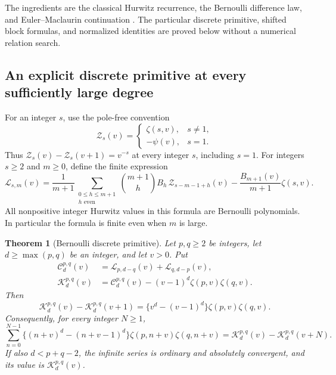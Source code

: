 \documentclass[11pt]{article}
\newtheorem{theorem}{Theorem}[section]
\theoremstyle{definition}
\theoremstyle{remark}
\numberwithin{equation}{section}
\begin{document}
The ingredients are the classical Hurwitz recurrence, the Bernoulli
difference law, and Euler--Maclaurin continuation
\cite{DLMF,DLMFBernoulli}.  The particular discrete
primitive, shifted block formulas, and normalized identities are proved
below without a numerical relation search.

\subsection{An explicit discrete primitive at every sufficiently large degree}

For an integer $s$, use the pole-free convention
\[
 \mathcal Z_s(v)=
 \begin{cases}
  \zeta(s,v),&s\ne1,\\
  -\psi(v),&s=1.
 \end{cases}
\]
Thus $\mathcal Z_s(v)-\mathcal Z_s(v+1)=v^{-s}$ at every
integer $s$, including $s=1$.  For integers $s\ge2$ and $m\ge0$,
define the finite expression
\begin{equation}\label{sh:L}
 \mathcal L_{s,m}(v)=\frac1{m+1}
    \sum_{\substack{0\le h\le m+1\\h\text{ even}}}
       \binom{m+1}{h}B_h\,
       \mathcal Z_{s-m-1+h}(v)
       -\frac{B_{m+1}(v)}{m+1}\zeta(s,v).
\end{equation}
All nonpositive integer Hurwitz values in this formula are Bernoulli
polynomials.  In particular the formula is finite even when $m$ is large.

\begin{theorem}[Bernoulli discrete primitive]\label{sh:primitive}
Let $p,q\ge2$ be integers, let $d\ge\max(p,q)$ be an integer,
and let $v>0$.  Put
\begin{align}
 \mathcal C_d^{p,q}(v)
   &=\mathcal L_{p,d-q}(v)+\mathcal L_{q,d-p}(v),\label{sh:Chigh}\\
 \mathcal K_d^{p,q}(v)
   &=\mathcal C_d^{p,q}(v)
       -(v-1)^d\zeta(p,v)\zeta(q,v).\label{sh:K}
\end{align}
Then
\begin{equation}\label{sh:antidifference}
 \boxed{\mathcal K_d^{p,q}(v)-\mathcal K_d^{p,q}(v+1)
  =\{v^d-(v-1)^d\}\zeta(p,v)\zeta(q,v).}
\end{equation}
Consequently, for every integer $N\ge1$,
\begin{equation}\label{sh:finitetelescoping}
 \sum_{n=0}^{N-1}
 \{(n+v)^d-(n+v-1)^d\}\zeta(p,n+v)\zeta(q,n+v)
 =\mathcal K_d^{p,q}(v)-\mathcal K_d^{p,q}(v+N).
\end{equation}
If also $d<p+q-2$, the infinite series is ordinary and absolutely
convergent, and its value is $\mathcal K_d^{p,q}(v)$.
\end{theorem}
\end{document}
